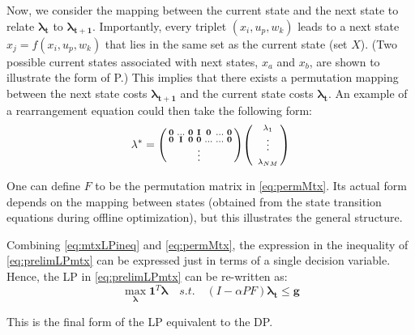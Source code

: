 \documentclass[conference]{IEEEtran}
\begin{document}
Now, we consider the mapping between the current state and the next state to relate $\boldsymbol{\lambda_{t}}$ to $\boldsymbol{\lambda_{t+1}}$. Importantly, every triplet $(x_{i},u_{p},w_{k})$ leads to a next state $x_{j}=f(x_{i},u_{p},w_{k})$ that lies in the same set as the current state (set $X$). (Two possible current states associated with next states, $x_{a}$ and $x_{b}$, are shown to illustrate the form of P.) This implies that there exists a permutation mapping between the next state costs $\boldsymbol{\lambda_{t+1}}$ and the current state costs $\boldsymbol{\lambda_{t}}$. An example of a rearrangement equation could then take the following form:
\begin{gather} \label{eq:permMtx}
\lambda^{*}
=
\begin{psmallmatrix}
    \bold{0} & \hdots & \bold{0} & \bold{I} & \bold{0} & \hdots & \bold{0} \\
    \bold{0} & \bold{I} & \bold{0} & \bold{0} & \hdots & \hdots & \bold{0} \\
    & & & \vdots\\
\end{psmallmatrix}
\begin{psmallmatrix}
    & \lambda_{1}\\
    & \vdots\\
    & \\
    & \lambda_{NM}
\end{psmallmatrix}
\end{gather}

One can define $F$ to be the permutation matrix in \eqref{eq:permMtx}. Its actual form depends on the mapping between states (obtained from the state transition equations during offline optimization), but this illustrates the general structure.

Combining \eqref{eq:mtxLPineq} and \eqref{eq:permMtx}, the expression in the inequality of \eqref{eq:prelimLPmtx} can be expressed just in terms of a single decision variable. Hence, the LP in \eqref{eq:prelimLPmtx} can be re-written as:
\begin{equation} \label{eq:LPfinal}
    \max_{\boldsymbol{\lambda}} \boldsymbol{1}^{T} \boldsymbol{\lambda}
    \hspace{1em}s.t.\hspace{1em}
    (I-\alpha PF)\boldsymbol{\lambda_{t}} \leq \boldsymbol{g}
\end{equation}

This is the final form of the LP equivalent to the DP. %
\end{document}
